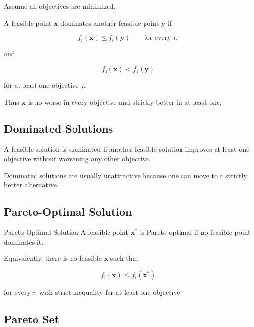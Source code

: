 Assume all objectives are minimized.

A feasible point \(\mathbf{x}\) dominates another feasible point
\(\mathbf{y}\) if

\[
\boxed{
f_i(\mathbf{x})
\leq
f_i(\mathbf{y})
\qquad
\text{for every }i,
}
\]

and

\[
\boxed{
f_j(\mathbf{x})
<
f_j(\mathbf{y})
}
\]

for at least one objective \(j\).

Thus \(\mathbf{x}\) is no worse in every objective and strictly better in
at least one.

\subsection{Dominated Solutions}
\label{subsec:dominated-solutions}

A feasible solution is dominated if another feasible solution improves at
least one objective without worsening any other objective.

Dominated solutions are usually unattractive because one can move to a
strictly better alternative.

\subsection{Pareto-Optimal Solution}
\label{subsec:pareto-optimal-solution}

\begin{definitionbox}{Pareto-Optimal Solution}
A feasible point \(\mathbf{x}^*\) is Pareto optimal if no feasible point
dominates it.
\end{definitionbox}

Equivalently, there is no feasible \(\mathbf{x}\) such that

\[
f_i(\mathbf{x})
\leq
f_i(\mathbf{x}^*)
\]

for every \(i\), with strict inequality for at least one objective.

\subsection{Pareto Set}
\label{subsec:pareto-set}

